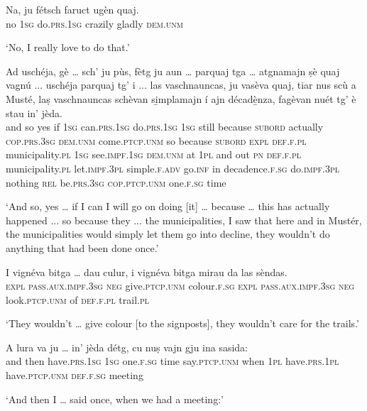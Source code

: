 \begin{linenumbers}
\gll Na, ju fétsch faruct ugèn quaj.   \\
no \textsc{1sg} do.\textsc{prs.1sg} crazily gladly \textsc{dem.unm} \\
\end{linenumbers}
\medskip
\glt `No, I really love to do that.'
\medskip

\largerpage
\begin{linenumbers}
\gll  Ad uschéja, gè … sch’ ju pùs, fètg ju aun … parquaj tga … atgnamajn ṣè quaj vagnú ... uschéja parquaj tg' i ... las vaschnauncas, ju vasèva quaj, tiar nus scù a Musté, laṣ vaschnauncas schèvan  s{i̱}mplamajn  í ajn décadè̱nza, fagèvan nuét tg’ è stau in’ jèda.  \\
and so yes {} if \textsc{1sg} can.\textsc{prs.1sg} do.\textsc{prs.1sg} \textsc{1sg} still {} because \textsc{subord} {} actually \textsc{cop.prs.3sg} \textsc{dem.unm}  come.\textsc{ptcp.unm} {} so because \textsc{subord} \textsc{expl} {} \textsc{def.f.pl} municipality.\textsc{pl} \textsc{1sg} see.\textsc{impf.1sg} \textsc{dem.unm} at \textsc{1pl} and out \textsc{pn} \textsc{def.f.pl} municipality.\textsc{pl} let.\textsc{impf.3pl} simple.\textsc{f.adv}  go.\textsc{inf} in decadence.\textsc{f.sg} do.\textsc{impf.3pl} nothing \textsc{rel} be.\textsc{prs.3sg} \textsc{cop.ptcp.unm} one.\textsc{f.sg} time\\
\end{linenumbers}
\medskip
\glt `And so, yes … if I can I will go on doing [it] … because … this has actually happened ... so because they ... the municipalities, I saw that here and in Mustér, the municipalities would simply let them go into decline, they wouldn’t do anything that had been done once.'
\medskip

\begin{linenumbers}
\gll I vignéva bitga … dau culur, i vignéva bitga mirau da las sèndas.   \\
 \textsc{expl} \textsc{pass.aux.impf.3sg} \textsc{neg} {} give.\textsc{ptcp.unm}  colour.\textsc{f.sg} \textsc{expl} \textsc{pass.aux.impf.3sg} \textsc{neg}  look.\textsc{ptcp.unm} of  \textsc{def.f.pl} trail.\textsc{pl}\\
\end{linenumbers}
\medskip
\glt `They wouldn’t … give colour [to the signposts], they wouldn’t care for the trails.'\medskip

\clearpage
\begin{linenumbers}
\gll  A lura va ju … in’ jèda détg, cu nuṣ vajn gju ina sasida:  \\
and then have.\textsc{prs.1sg} \textsc{1sg} {} one.\textsc{f.sg} time say.\textsc{ptcp.unm} when \textsc{1pl} have.\textsc{prs.1pl} have.\textsc{ptcp.unm} \textsc{def.f.sg} meeting  \\
\end{linenumbers}
\medskip
\glt `And then I … said once, when we had a meeting:'
\medskip


